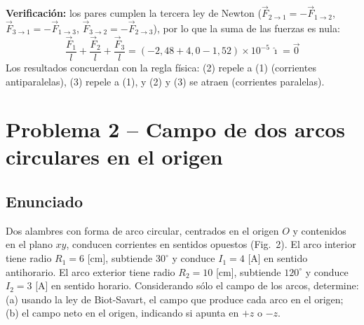 \documentclass[12pt,letterpaper]{article}
\begin{document}
\noindent\textbf{Verificaci\'on:} los pares cumplen la tercera ley de Newton
($\vec{F}_{2\to1} = -\vec{F}_{1\to2}$, $\vec{F}_{3\to1} = -\vec{F}_{1\to3}$,
$\vec{F}_{3\to2} = -\vec{F}_{2\to3}$), por lo que la suma de las fuerzas es nula:
\[
    \frac{\vec{F}_1}{l} + \frac{\vec{F}_2}{l} + \frac{\vec{F}_3}{l}
    = (-2{,}48 + 4{,}0 - 1{,}52)\times10^{-5}\,\hat{\imath} = \vec{0}
\]
Los resultados concuerdan con la regla f\'isica: (2) repele a (1) (corrientes antiparalelas),
(3) repele a (1), y (2) y (3) se atraen (corrientes paralelas).

\newpage
\section*{Problema 2 -- Campo de dos arcos circulares en el origen}

\subsection*{Enunciado}

Dos alambres con forma de arco circular, centrados en el origen $O$ y contenidos en el plano $xy$,
conducen corrientes en sentidos opuestos (Fig.\ 2). El arco interior tiene radio $R_1 = 6$ [cm],
subtiende $30^\circ$ y conduce $I_1 = 4$ [A] en sentido antihorario. El arco exterior tiene radio
$R_2 = 10$ [cm], subtiende $120^\circ$ y conduce $I_2 = 3$ [A] en sentido horario. Considerando s\'olo
el campo de los arcos, determine: (a) usando la ley de Biot-Savart, el campo que produce cada arco
en el origen; (b) el campo neto en el origen, indicando si apunta en $+z$ o $-z$.
\end{document}
